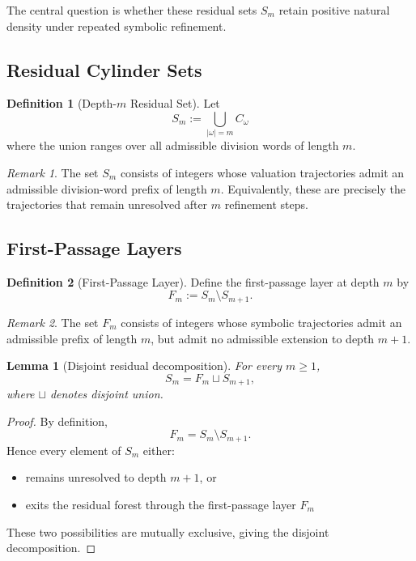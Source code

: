 \documentclass[12pt, oneside]{article}
\numberwithin{equation}{section}
\theoremstyle{definition}
\newtheorem{definition}{Definition}[section]
\theoremstyle{plain}
\newtheorem{lemma}[theorem]{Lemma}
\theoremstyle{remark}
\newtheorem*{remark}{Remark}
\begin{document}
The central question is whether these residual sets \(S_m\) retain
positive natural density under repeated symbolic refinement.

\subsection{Residual Cylinder Sets}

\begin{definition}[Depth-$m$ Residual Set]
Let
\[
S_m := \bigcup_{|\omega|=m} C_\omega
\]
where the union ranges over all admissible division words of length \(m\).
\end{definition}

\begin{remark}
The set \(S_m\) consists of integers whose valuation trajectories admit
an admissible division-word prefix of length \(m\). Equivalently, these
are precisely the trajectories that remain unresolved after \(m\)
refinement steps.
\end{remark}

\subsection{First-Passage Layers}

\begin{definition}[First-Passage Layer]
Define the first-passage layer at depth \(m\) by
\[
F_m := S_m \setminus S_{m+1}.
\]
\end{definition}

\begin{remark}
The set \(F_m\) consists of integers whose symbolic trajectories
admit an admissible prefix of length \(m\), but admit no admissible
extension to depth \(m+1\).
\end{remark}

\begin{lemma}[Disjoint residual decomposition]
For every \(m\ge1\),
\[
S_m = F_m \sqcup S_{m+1},
\]
where \(\sqcup\) denotes disjoint union.
\end{lemma}

\begin{proof}
By definition,
\[
F_m = S_m \setminus S_{m+1}.
\]
Hence every element of \(S_m\) either:
\begin{itemize}
\item remains unresolved to depth \(m+1\), or
\item exits the residual forest through the first-passage layer \(F_m\)
\end{itemize}

These two possibilities are mutually exclusive, giving the disjoint decomposition.
\end{proof}
\end{document}
